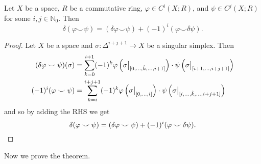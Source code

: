 \begin{lemma}
    Let $X$ be a space, $R$ be a commutative ring, $\varphi \in C^i(X; R)$, and $\psi \in C^j(X; R)$ for some $i, j \in \mathbb N_0$. Then
    \[
        \delta(\varphi \smile \psi) = (\delta\varphi \smile \psi) + (-1)^i (\varphi \smile \delta\psi).
    \]
\end{lemma}

\begin{proof}
    Let $X$ be a space and $\sigma: \Delta^{i+j+1} \to X$ be a singular simplex. Then
    \begin{align*}
        (\delta\varphi \smile \psi)(\sigma)
         & = \sum_{k=0}^{i+1} (-1)^k \varphi\left(\restr{\sigma}{[0, \ldots, \hat k, \ldots, i+1]}\right) \cdot \psi\left(\restr{\sigma}{[i+1, \ldots, i+j+1]}\right)   \\
        (-1)^i (\varphi \smile \psi)
         & = \sum_{k=i}^{i+j+1} (-1)^k \varphi\left(\restr{\sigma}{[0, \ldots, i]}\right) \cdot \psi\left(\restr{\sigma}{[i, \ldots, \hat k, \ldots, i + j + 1]}\right)
    \end{align*}
    and so by adding the RHS we get
    \[ \delta(\varphi \smile \psi) = (\delta\varphi \smile \psi) + (-1)^i(\varphi \smile \delta\psi).\qedhere\]
\end{proof}

Now we prove the theorem.

